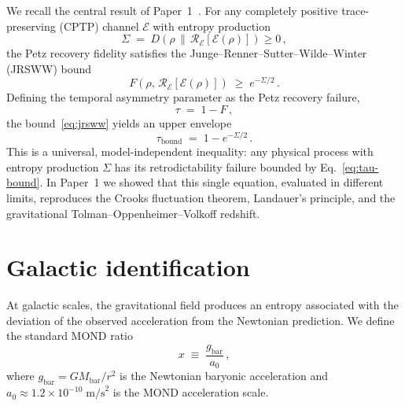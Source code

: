 \documentclass[prd,twocolumn,superscriptaddress,longbibliography,floatfix]{revtex4-2}
\newcommand{\tauasym}{\tau}
\begin{document}
We recall the central result of Paper~1~\cite{Huang2025paper1}.
For any completely positive trace-preserving (CPTP) channel
$\mathcal{E}$ with entropy production
\begin{equation}
  \Sigma \;=\; D\!\left(\rho \,\big\|\,
  \mathcal{R}_{\mathcal{E}}[\mathcal{E}(\rho)]\right) \geq 0\,,
  \label{eq:sigma-def}
\end{equation}
the Petz recovery fidelity satisfies the
Junge--Renner--Sutter--Wilde--Winter (JRSWW)
bound~\cite{JRSWW2018}
\begin{equation}
  F\!\left(\rho,\,
  \mathcal{R}_{\mathcal{E}}[\mathcal{E}(\rho)]\right)
  \;\geq\; e^{-\Sigma/2}\,.
  \label{eq:jrsww}
\end{equation}
Defining the temporal asymmetry parameter as the Petz recovery
failure,
\begin{equation}
  \tauasym \;=\; 1 - F\,,
  \label{eq:tau-def}
\end{equation}
the bound~\eqref{eq:jrsww} yields an upper envelope
\begin{equation}
  \tauasym_{\mathrm{bound}} \;=\;
  1 - e^{-\Sigma/2}\,.
  \label{eq:tau-bound}
\end{equation}
This is a universal, model-independent inequality: any physical
process with entropy production $\Sigma$ has its retrodictability
failure bounded by Eq.~\eqref{eq:tau-bound}. In Paper~1 we showed
that this single equation, evaluated in different limits, reproduces
the Crooks fluctuation theorem, Landauer's principle, and the
gravitational Tolman--Oppenheimer--Volkoff redshift.

\section{Galactic identification}
\label{sec:galactic}

At galactic scales, the gravitational field produces an entropy
associated with the deviation of the observed acceleration from
the Newtonian prediction. We define the standard MOND ratio
\begin{equation}
  x \;\equiv\; \frac{g_{\mathrm{bar}}}{a_0}\,,
  \label{eq:x-def}
\end{equation}
where $g_{\mathrm{bar}} = GM_{\mathrm{bar}}/r^2$ is the
Newtonian baryonic acceleration and
$a_0 \approx 1.2 \times 10^{-10}\;\mathrm{m/s}^2$ is the
MOND acceleration scale.
\end{document}
